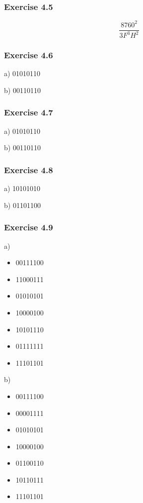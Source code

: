 \documentclass[../../main.tex]{subfiles}
\begin{document}
\subsubsection*{Exercise 4.5}

$$
\frac{8760^{2}}{3F^{3}H^{2}}
$$

\subsubsection*{Exercise 4.6}

a) 01010110

b) 00110110

\subsubsection*{Exercise 4.7}

a) 01010110

b) 00110110

\subsubsection*{Exercise 4.8}

a) 10101010

b) 01101100

\subsubsection*{Exercise 4.9}

a)

\begin{itemize}
  \item 00111100
  \item 11000111
  \item 01010101
  \item 10000100
  \item 10101110
  \item 01111111
  \item 11101101
\end{itemize}

b)

\begin{itemize}
  \item 00111100
  \item 00001111
  \item 01010101
  \item 10000100
  \item 01100110
  \item 10110111
  \item 11101101
\end{itemize}
\end{document}
